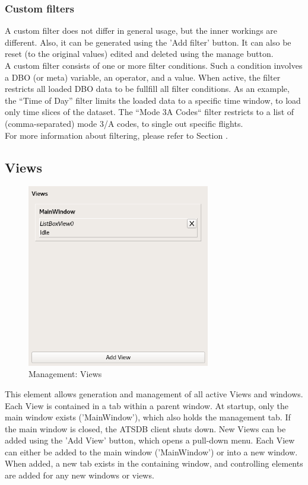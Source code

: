 \documentclass[10pt,letterpaper,extrafontsizes]{memoir}
\begin{document}
\subsubsection{Custom filters}
A  custom  filter  does  not  differ  in  general  usage,  but  the  inner  workings  are  different.   Also,  it  can  be generated using the 'Add filter' button. It can also be reset (to the original values) edited and deleted using
the manage button. \\
A custom filter consists of one or more filter conditions.  Such a condition involves a DBO (or meta) variable, an operator, and a value.  When active, the filter restricts all loaded DBO data to be fullfill all filter conditions.
As an example, the ``Time of Day'' filter limits the loaded data to a specific time window, to load only time slices of the dataset.  The ``Mode 3A Codes`` filter restricts to a list of (comma-separated) mode 3/A codes, to single out specific flights. \\

For more information about filtering, please refer to Section .

\subsection{Views}

\begin{figure}[H]
  \center
    \includegraphics[width=8cm]{../screenshots/management_views.png}
  \caption{Management: Views}
  \label{fig:management_views}
\end{figure}

This element allows generation and management of all active Views and windows. Each View is contained
in a tab within a parent window.  At startup, only the main window exists ('MainWindow'), which also holds
the management tab. If the main window is closed, the ATSDB client shuts down. New Views can be added using the 'Add View' button, which opens a pull-down menu. Each View can either be added to the main window ('MainWindow') or into a new window. When added, a new tab exists in the containing window, and controlling elements are added for any new
windows or views. \\
\end{document}
